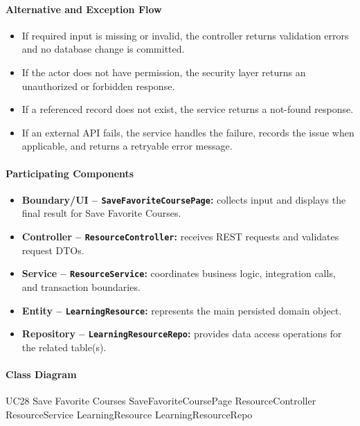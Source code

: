 \paragraph{Alternative and Exception Flow}

\begin{itemize}
    \item If required input is missing or invalid, the controller returns validation errors and no database change is committed.
    \item If the actor does not have permission, the security layer returns an unauthorized or forbidden response.
    \item If a referenced record does not exist, the service returns a not-found response.
    \item If an external API fails, the service handles the failure, records the issue when applicable, and returns a retryable error message.
\end{itemize}

\paragraph{Participating Components}

\begin{itemize}
    \item \textbf{Boundary/UI -- \texttt{SaveFavoriteCoursePage}:} collects input and displays the final result for Save Favorite Courses.
    \item \textbf{Controller -- \texttt{ResourceController}:} receives REST requests and validates request DTOs.
    \item \textbf{Service -- \texttt{ResourceService}:} coordinates business logic, integration calls, and transaction boundaries.
    \item \textbf{Entity -- \texttt{LearningResource}:} represents the main persisted domain object.
    \item \textbf{Repository -- \texttt{LearningResourceRepo}:} provides data access operations for the related table(s).
\end{itemize}

\paragraph{Class Diagram}

\ClassDiagram
{UC28 Save Favorite Courses}
{SaveFavoriteCoursePage}
{ResourceController}
{ResourceService}
{LearningResource}
{LearningResourceRepo}

